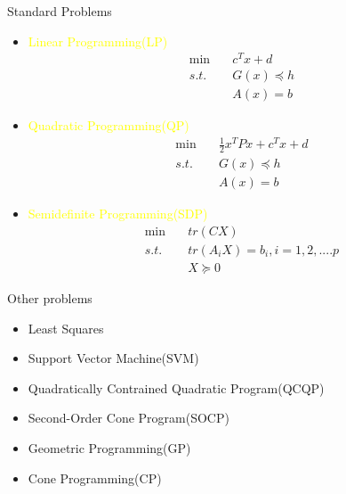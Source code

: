     \begin{frame}{Standard Problems}
      \vspace{-2pt}
      \begin{itemize}
        \item \textcolor{yellow}{Linear Programming(LP)}
        \[
        \begin{aligned}
        \min &\quad c^Tx+d \\
        s.t. &\quad G(x) \preceq h \\
            &\quad A(x) = b
        \end{aligned}
        \]
        \item \textcolor{yellow}{Quadratic Programming(QP)}
        \[
        \begin{aligned}
        \min &\quad \frac{1}{2}x^TPx+c^Tx+d \\
        s.t. &\quad G(x) \preceq h \\
             &\quad A(x) = b
        \end{aligned}
        \]
        \item \textcolor{yellow}{Semidefinite Programming(SDP)}
        \[
        \begin{aligned}
        \min &\quad tr(CX) \\
        s.t. &\quad tr(A_iX)=b_i, i=1,2,....p \\
             &\quad X \succeq 0
        \end{aligned}
        \]
      \end{itemize}
    \end{frame}

    \begin{frame}{Other problems}
      \Large
      \begin{itemize}
        \item Least Squares
        \item Support Vector Machine(SVM)
        \item Quadratically Contrained Quadratic Program(QCQP)
        \item Second-Order Cone Program(SOCP)
        \item Geometric Programming(GP)
        \item Cone Programming(CP)
      \end{itemize}
    \end{frame}

